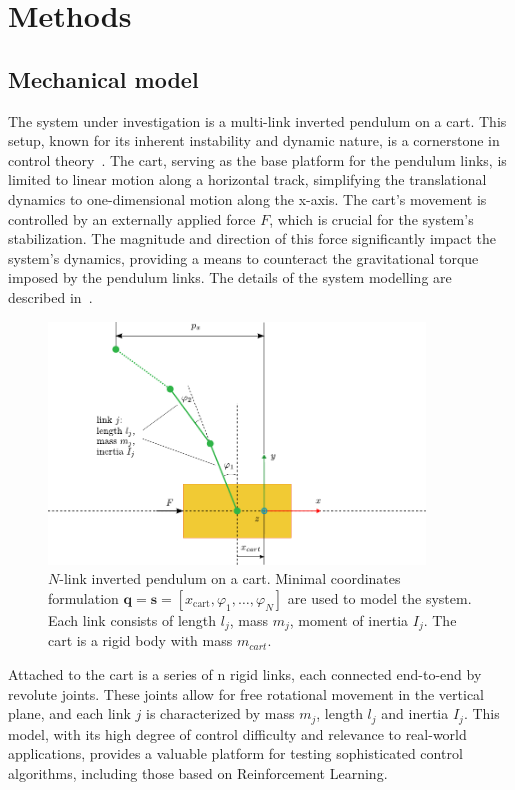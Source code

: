 \section{Methods} \label{sec: Methods}

\subsection{Mechanical model} \label{subsec: Mechanical model}

The system under investigation is a multi-link inverted pendulum on a cart. This setup, known for its inherent instability and dynamic nature, is a cornerstone in control theory~\cite{Fantoni2001Nonlinear}. The cart, serving as the base platform for the pendulum links, is limited to linear motion along a horizontal track, simplifying the translational dynamics to one-dimensional motion along the x-axis. The cart's movement is controlled by an externally applied force $F$, which is crucial for the system's stabilization. The magnitude and direction of this force significantly impact the system's dynamics, providing a means to counteract the gravitational torque imposed by the pendulum links. The details of the system modelling are described in~\cite{manzl2023relrl}.

\begin{figure}[h]
\centering
\includegraphics[width=10cm]{Figures/cart_pole_model_phi.pdf}
\caption{$N$-link inverted pendulum on a cart. Minimal coordinates formulation $\mathbf{q} = \mathbf{s} =  [x_{\text{cart}}, \varphi_1, \ldots, \varphi_N]$ are used to model the system. Each link consists of length $l_j$, mass $m_j$, moment of inertia $I_j$. The cart is a rigid body with mass $m_{cart}$.}
\label{fig: n-pendulum on a cart}
\end{figure}

Attached to the cart is a series of n rigid links, each connected end-to-end by revolute joints. These joints allow for free rotational movement in the vertical plane, and each link 
$j$ is characterized by mass $m_j$, length $l_j$ and inertia $I_j$.
This model, with its high degree of control difficulty and relevance to real-world applications, provides a valuable platform for testing sophisticated control algorithms, including those based on Reinforcement Learning.

